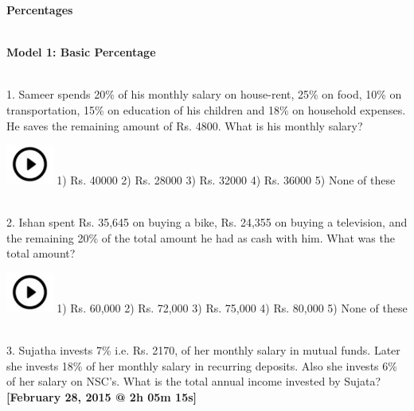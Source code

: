 \documentclass{article}
\begin{document}
\noindent \begin{center}
	{\LARGE \textbf{Percentages \\}}
\end{center}




\noindent 

\noindent \\ \textbf{Model 1: Basic Percentage}

\noindent 

\noindent \\ 1.   Sameer spends 20\% of his monthly salary on house-rent, 25\% on food, 10\% on transportation, 15\% on education of his children and 18\% on household expenses. He saves the remaining amount of Rs. 4800. What is his monthly salary?

\noindent 

\noindent \includegraphics*[width=0.61in, height=0.52in]{images/image1} 1) Rs. 40000               2) Rs. 28000        3) Rs. 32000        4) Rs. 36000        5) None of these

\noindent 

\noindent 

\noindent 

\noindent \\ 2.   Ishan spent Rs. 35,645 on buying a bike, Rs. 24,355 on buying a television, and the remaining 20\% of the total amount he had as cash with him. What was the total amount?



\noindent\includegraphics*[width=0.61in, height=0.52in]{images/image1} 1) Rs. 60,000                  2) Rs. 72,000       3) Rs. 75,000       4) Rs. 80,000       5) None of these

\noindent 

\noindent 

\noindent \\ 3.   Sujatha invests 7\% i.e. Rs. 2170, of her monthly salary in mutual funds. Later she invests 18\% of her monthly salary in recurring deposits. Also she invests 6\% of her salary on NSC's. What is the total annual income invested by Sujata?
\noindent \textbf{[February 28, 2015 @ 2h 05m 15s]}
\end{document}
